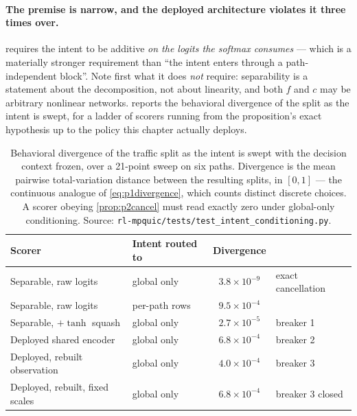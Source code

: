 \paragraph{The premise is narrow, and the deployed architecture violates it three times over.}
 requires the intent to be additive \emph{on the logits the softmax consumes} ---
which is a materially stronger requirement than ``the intent enters through a path-independent block''.
Note first what it does \emph{not} require: separability is a statement about the decomposition, not
about linearity, and both $f$ and $c$ may be arbitrary nonlinear networks.  reports
the behavioral divergence of the split as the intent is swept, for a ladder of scorers running from the
proposition's exact hypothesis up to the policy this chapter actually deploys.

\begin{table}[t]
  \centering
  \caption[Behavioral divergence of the split as the intent is swept]{Behavioral divergence of the traffic split as the intent is swept with the decision context
  frozen, over a 21-point sweep on six paths. Divergence is the mean pairwise total-variation distance
  between the resulting splits, in $[0,1]$ --- the continuous analogue of \cref{eq:p1divergence}, which
  counts distinct discrete choices. A scorer obeying \cref{prop:p2cancel} must read exactly zero under
  global-only conditioning. Source: \texttt{rl-mpquic/tests/test\_intent\_conditioning.py}.}
  \label{tab:p2cancel}
  \small
  \begin{tabular}{llcl}
    \toprule
    Scorer & Intent routed to & Divergence & \\
    \midrule
    Separable, raw logits            & global only   & $3.8\times10^{-9}$ & exact cancellation \\
    Separable, raw logits            & per-path rows & $9.5\times10^{-4}$ & \\
    \midrule
    Separable, $+\tanh$ squash       & global only   & $2.7\times10^{-5}$ & breaker 1 \\
    Deployed shared encoder          & global only   & $6.8\times10^{-4}$ & breaker 2 \\
    Deployed, rebuilt observation    & global only   & $4.0\times10^{-4}$ & breaker 3 \\
    Deployed, rebuilt, fixed scales  & global only   & $6.8\times10^{-4}$ & breaker 3 closed \\
    \bottomrule
  \end{tabular}
\end{table}

